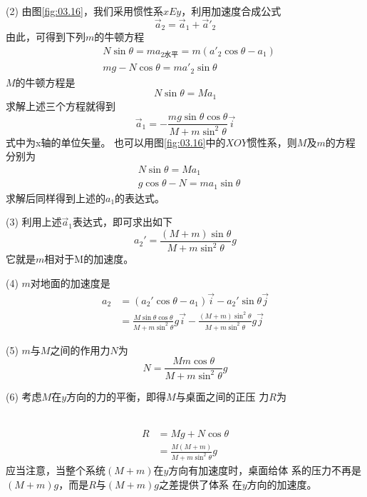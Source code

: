 (2) 由图\ref{fig:03.16}，我们采用惯性系$ xEy $，利用加速度合成公式
\begin{equation*}
    \vec{a} _ { 2 } = \vec{a} _ { 1 } + \vec{a}' _ 2
\end{equation*}
由此，可得到下列$ m $的牛顿方程
\begin{align*}
    &N \sin \theta = m a _ { 2\text{水平} }  = m \left( a '_2 \cos \theta - a _ { 1 } \right) \\
    &m g - N \cos \theta = m a' _ { 2 } \sin \theta
\end{align*}
$ M $的牛顿方程是
\begin{equation*}
    N \sin \theta = M a _ { 1 }
\end{equation*}
求解上述三个方程就得到
\begin{equation*}
    \vec{a} _ { 1 } = - \frac { m g \sin \theta \cos \theta} { M + m \sin ^ { 2 } \theta } \vec{i}
\end{equation*}式中为x轴的单位矢量。
也可以用图\ref{fig:03.16}\;中的$ XOY $惯性系，则$ M $及$ m $的方程分别为
\begin{align*}
    &N \sin \theta = M a _ { 1 } \\
    &g \cos \theta - N = m a _ { 1 } \sin \theta
\end{align*}
求解后同样得到上述的$ a_1 $的表达式。

(3) 利用上述$\vec{a}_1$表达式，即可求出如下
\begin{equation*}
    a _ 2 ' = \frac { \left( M + m \right) \sin \theta } { M + m \sin ^ { 2 } \theta } g
\end{equation*}
它就是$ m $相对于M的加速度。

(4) $ m $对地面的加速度是
\begin{align*}
    a _ { 2 } &= \left( a _ { 2 }' \cos \theta - a _ { 1 } \right) \vec{i} - a _ 2 ' \sin \theta \vec{j} \\
    &= \frac { M \sin \theta \cos \theta } { M + m \sin ^ { 2 } \theta } g \vec{i} - \frac { \left( M + m \right) \sin ^ { 2 } \theta } { M + m \sin ^ { 2 } \theta } g \vec{j}
\end{align*}

(5) $ m $与$ M $之间的作用力$ N $为
\begin{equation*}
    N = \frac { M  m \cos \theta } { M + m \sin ^ { 2 } \theta } g
\end{equation*}

(6) 考虑$ M $在$ y $方向的力的平衡，即得$ M $与桌面之间的正压
力$ R $为

~\vspace{-1.56em}
\begin{align*}
    R &= M g + N \cos \theta \\
    &= \frac { M \left( M + m \right) } { M + m \sin ^ { 2 } \theta } g
\end{align*}
应当注意，当整个系统$  \left( M + m \right)  $在$ y $方向有加速度时，桌面给体
系的压力不再是$  \left( M + m \right) g  $，而是$ R $与$  \left( M + m \right) g  $之差提供了体系
在$ y $方向的加速度。